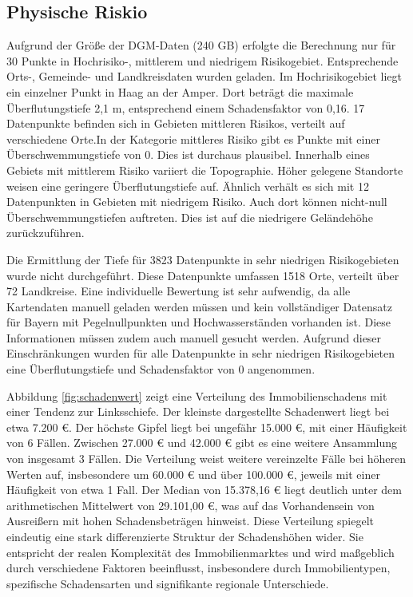 \subsection{Physische Riskio}
Aufgrund der Größe der \ac{DGM}-Daten (240 GB) erfolgte die Berechnung nur für 30 Punkte in Hochrisiko-, mittlerem und niedrigem Risikogebiet. Entsprechende Orts-, Gemeinde- und Landkreisdaten wurden geladen.
Im Hochrisikogebiet liegt ein einzelner Punkt in Haag an der Amper. Dort beträgt die maximale Überflutungstiefe 2,1 m, entsprechend einem Schadensfaktor von 0,16.
17 Datenpunkte befinden sich in Gebieten mittleren Risikos, verteilt auf verschiedene Orte.In der Kategorie mittleres Risiko gibt es Punkte mit einer Überschwemmungstiefe von 0. Dies ist durchaus plausibel. Innerhalb eines Gebiets mit mittlerem Risiko variiert die Topographie. Höher gelegene Standorte weisen eine geringere Überflutungstiefe auf. Ähnlich verhält es sich mit 12 Datenpunkten in Gebieten mit niedrigem Risiko. Auch dort können nicht-null Überschwemmungstiefen auftreten. Dies ist auf die niedrigere Geländehöhe zurückzuführen. 

Die Ermittlung der Tiefe für 3823 Datenpunkte in sehr niedrigen Risikogebieten wurde nicht durchgeführt. Diese Datenpunkte umfassen 1518 Orte, verteilt über 72 Landkreise. Eine individuelle Bewertung ist sehr aufwendig, da alle Kartendaten manuell geladen werden müssen und kein vollständiger Datensatz für Bayern mit Pegelnullpunkten und Hochwasserständen vorhanden ist. Diese Informationen müssen zudem auch manuell gesucht werden. Aufgrund dieser Einschränkungen wurden für alle Datenpunkte in sehr niedrigen Risikogebieten eine Überflutungstiefe und Schadensfaktor von 0 angenommen.

Abbildung \ref{fig:schadenwert} zeigt eine Verteilung des Immobilienschadens mit einer Tendenz zur Linksschiefe. Der kleinste dargestellte Schadenwert liegt bei etwa 7.200 €. Der höchste Gipfel liegt bei ungefähr 15.000 €, mit einer Häufigkeit von 6 Fällen. Zwischen 27.000 € und 42.000 € gibt es eine weitere Ansammlung von insgesamt 3 Fällen. Die Verteilung weist weitere vereinzelte Fälle bei höheren Werten auf, insbesondere um 60.000 € und über 100.000 €, jeweils mit einer Häufigkeit von etwa 1 Fall.  Der Median von 15.378,16 € liegt deutlich unter dem arithmetischen Mittelwert von 29.101,00 €, was auf das Vorhandensein von Ausreißern mit hohen Schadensbeträgen hinweist. Diese Verteilung spiegelt eindeutig eine stark differenzierte Struktur der Schadenshöhen wider. Sie entspricht der realen Komplexität des Immobilienmarktes und wird maßgeblich durch verschiedene Faktoren beeinflusst, insbesondere durch Immobilientypen, spezifische Schadensarten und signifikante regionale Unterschiede.


